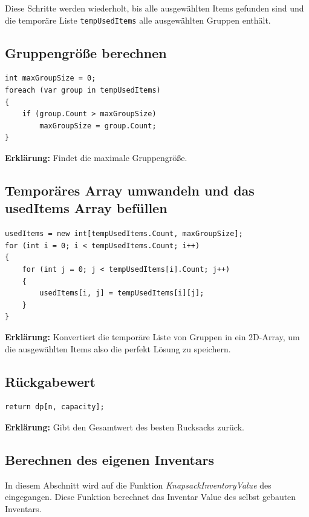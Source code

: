 Diese Schritte werden wiederholt, bis alle ausgewählten Items gefunden sind und die temporäre Liste \texttt{tempUsedItems} alle ausgewählten Gruppen enthält.\\

\subsection*{Gruppengröße berechnen}
\begin{lstlisting}[style=csharp, caption={}, label=code:maxgroup]
int maxGroupSize = 0;
foreach (var group in tempUsedItems)
{
    if (group.Count > maxGroupSize)
        maxGroupSize = group.Count;
}
\end{lstlisting}
\textbf{Erklärung:} Findet die maximale Gruppengröße.\\

\subsection*{Temporäres Array umwandeln und das usedItems Array befüllen}
\begin{lstlisting}[style=csharp, caption={}, label=code:convert]
usedItems = new int[tempUsedItems.Count, maxGroupSize];
for (int i = 0; i < tempUsedItems.Count; i++)
{
    for (int j = 0; j < tempUsedItems[i].Count; j++)
    {
        usedItems[i, j] = tempUsedItems[i][j];
    }
}
\end{lstlisting}
\textbf{Erklärung:} Konvertiert die temporäre Liste von Gruppen in ein 2D-Array, um die ausgewählten Items also die perfekt Lösung zu speichern.\\

\subsection*{Rückgabewert}
\begin{lstlisting}[style=csharp, caption={}, label=code:return]
return dp[n, capacity];
\end{lstlisting}
\textbf{Erklärung:} Gibt den Gesamtwert des besten Rucksacks zurück.\\

\subsection{Berechnen des eigenen Inventars}
In diesem Abschnitt wird auf die Funktion \textit{KnapsackInventoryValue} des  eingegangen. Diese Funktion
berechnet das Inventar Value des selbst gebauten Inventars.

